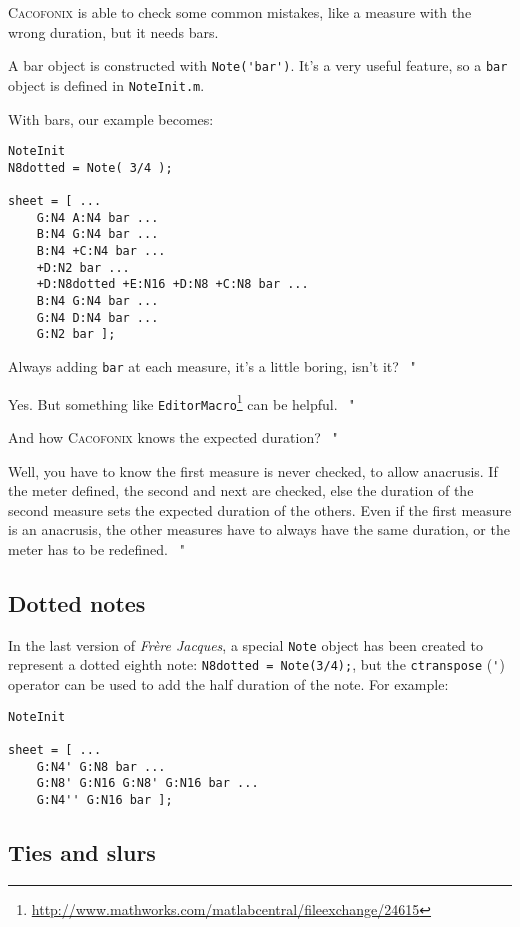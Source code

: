 \documentclass{article}
\newcommand\cacofonix{\textsc{Cacofonix}\xspace}
\newcommand\note{\lstinline!Note!\xspace}
\newcommand\frerejaques{\emph{Fr\`ere Jacques}\xspace}
\newcommand\noteInitFile{\texttt{NoteInit.m}\xspace}
\newcommand\exchange[2]{\texttt{#1}\footnote{\url{#2}}\xspace}
\newenvironment{meenv}{ \par \noindent \makebox[6em][r]{ \textcolor{mecolor}{Me}: " --~}}{~"}
\newenvironment{myselfenv}{ \par \noindent \makebox[6em][r]{ \textcolor{myselfcolor}{Myself}: " --~}}{~"}
\newcommand{ \me }[1]{%
\begin{meenv}%
	#1%
\end{meenv} }
\newcommand{ \myself }[1]{%
\begin{myselfenv}%
	#1%
\end{myselfenv} }
\begin{document}
\cacofonix is able to check some common mistakes, like a measure with the wrong duration, but it needs bars.

A bar object is constructed with \lstinline!Note('bar')!. It's a very useful feature, so a \lstinline!bar! object is defined in \noteInitFile.

With bars, our example becomes:
\begin{lstlisting}
NoteInit
N8dotted = Note( 3/4 );

sheet = [ ...
	G:N4 A:N4 bar ...
	B:N4 G:N4 bar ...
	B:N4 +C:N4 bar ...
	+D:N2 bar ...
	+D:N8dotted +E:N16 +D:N8 +C:N8 bar ...
	B:N4 G:N4 bar ...
	G:N4 D:N4 bar ...
	G:N2 bar ];
\end{lstlisting}

\me{Always adding \lstinline!bar! at each measure, it's a little boring, isn't it?}
\myself{Yes. But something like \exchange{EditorMacro}{http://www.mathworks.com/matlabcentral/fileexchange/24615} can be helpful.}
\me{ And how \cacofonix knows the expected duration?}
\myself{Well, you have to know the first measure is never checked, to allow anacrusis. If the meter defined, the second and next are checked, else the duration of the second measure sets the expected duration of the others. Even if the first measure is an anacrusis, the other measures have to always have the same duration, or the meter has to be redefined.}

\subsection{Dotted notes}

In the last version of \frerejaques, a special \note object has been created to represent a dotted eighth note: \lstinline!N8dotted = Note(3/4);!, but the \lstinline!ctranspose! (\lstinline!'!) operator can be used to add the half duration of the note. For example: \\

\begin{lstlisting}
NoteInit

sheet = [ ...
	G:N4' G:N8 bar ...
	G:N8' G:N16 G:N8' G:N16 bar ...
	G:N4'' G:N16 bar ];
\end{lstlisting}

\subsection{Ties and slurs}
\end{document}
